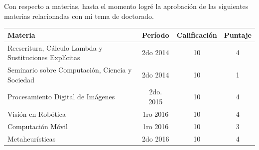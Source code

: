 \documentclass{article}
\begin{document}
Con respecto a materias, hasta el momento logré la aprobación de las siguientes materias relacionadas con mi tema de doctorado.

\hfill

\centering
\begin{tabular}{l c c c}

\textsf{Materia} & \textsf{Período} & \textsf{Calificación} & \textsf{Puntaje}\\
\hline
Reescritura, Cálculo Lambda y Sustituciones Explícitas & 2do 2014 & 10 & 4\\
Seminario sobre Computación, Ciencia y Sociedad & 2do 2014 & 10 & 1\\
Procesamiento Digital de Imágenes & 2do. 2015 & 10  & 4 \\
Visión en Robótica & 1ro 2016 & 10 & 4 \\ 
Computación Móvil & 1ro 2016 & 10 & 3 \\ 
Metaheurísticas & 2do 2016 & 10 & 4 \\ 
\hline
\end{tabular}



\end{document}
